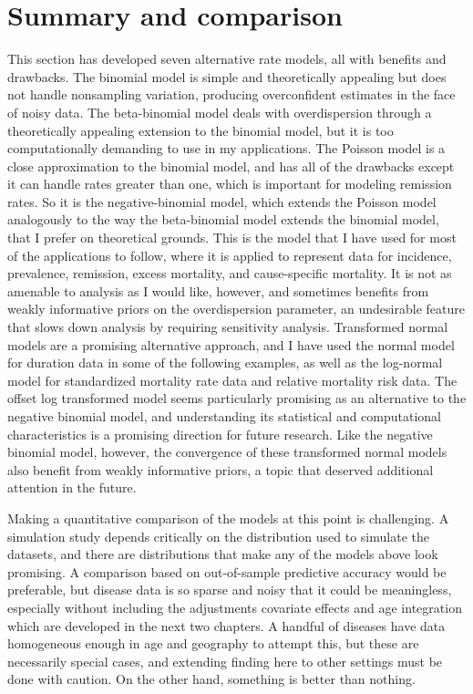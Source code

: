 \section{Summary and comparison}
This section has developed seven alternative rate models, all with
benefits and drawbacks.  The binomial model is simple and
theoretically appealing but does not handle nonsampling variation,
producing overconfident estimates in the face of noisy data.  The
beta-binomial model deals with overdispersion through a theoretically
appealing extension to the binomial model, but it is too
computationally demanding to use in my applications.  The Poisson
model is a close approximation to the binomial model, and has all of
the drawbacks except it can handle rates greater than one, which is
important for modeling remission rates.  So it is the
negative-binomial model, which extends the Poisson model analogously
to the way the beta-binomial model extends the binomial model, that I
prefer on theoretical grounds.  This is the model that I have used for
most of the applications to follow, where it is applied to represent
data for incidence, prevalence, remission, excess mortality, and
cause-specific mortality. It is not as amenable to analysis as I would
like, however, and sometimes benefits from weakly informative priors on
the overdispersion parameter, an undesirable feature that slows down
analysis by requiring sensitivity analysis.  Transformed normal models
are a promising alternative approach, and I have used the normal model
for duration data in some of the following examples, as well as the
log-normal model for standardized mortality rate data and relative
mortality risk data. The offset log transformed model seems
particularly promising as an alternative to the negative binomial
model, and understanding its statistical and computational
characteristics is a promising direction for future research.  Like
the negative binomial model, however, the convergence of these
transformed normal models also benefit from weakly informative priors,
a topic that deserved additional attention in the future.

Making a quantitative comparison of the models at this point is
challenging.  A simulation study depends critically on the
distribution used to simulate the datasets, and there are
distributions that make any of the models above look promising.  A
comparison based on out-of-sample predictive accuracy would be
preferable, but disease data is so sparse and noisy that it could be
meaningless, especially without including the adjustments covariate
effects and age integration which are developed in the next two
chapters.  A handful of diseases have data homogeneous enough in age
and geography to attempt this, but these are necessarily special
cases, and extending finding here to other settings must be done with
caution.  On the other hand, something is better than nothing.

